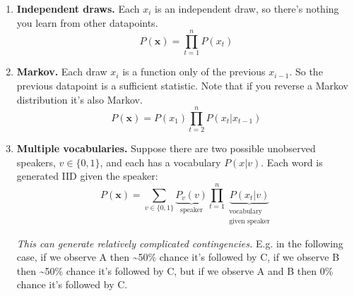 \documentclass[
  11pt,
  letterpaper,
  DIV=11,
  numbers=noendperiod,
  oneside]{scrartcl}
\newcommand{\ut}[2]{\underbrace{#1}_{\text{#2}}}
\newcommand{\utt}[3]{\underbrace{#1}_{\substack{\text{#2}\\\text{#3}}}}
\begin{document}
\begin{enumerate}
\def\labelenumi{\arabic{enumi}.}
\item
  \textbf{Independent draws.} Each \(x_i\) is an independent draw, so
  there's nothing you learn from other datapoints.
  \[P(\bm{x})=\prod_{t=1}^n P(x_t)\]
\item
  \textbf{Markov.} Each draw \(x_i\) is a function only of the previous
  \(x_{i-1}\). So the previous datapoint is a sufficient statistic. Note
  that if you reverse a Markov distribution it's also Markov.
  \[P(\bm{x})=P(x_1)\prod_{t=2}^n P(x_t|x_{t-1})\]
\item
  \textbf{Multiple vocabularies.} Suppose there are two possible
  unobserved speakers, \(v\in\{0,1\}\), and each has a vocabulary
  \(P(x|v)\). Each word is generated IID given the speaker:
  \[P(\bm{x})=\sum_{v\in\{0,1\}}\ut{P_v(v)}{speaker}\prod_{t=1}^n \utt{P(x_t|v)}{vocabulary}{given speaker}\]

  \emph{This can generate relatively complicated contingencies.} E.g. in
  the following case, if we observe A then \textasciitilde50\% chance
  it's followed by C, if we observe B then \textasciitilde50\% chance
  it's followed by C, but if we observe A and B then 0\% chance it's
  followed by C.


\end{enumerate}
\end{document}

